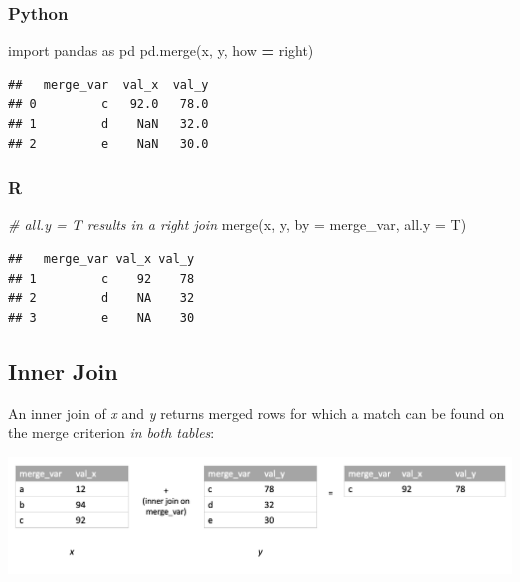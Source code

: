 \documentclass[
]{book}
\newenvironment{Shaded}{\begin{snugshade}}{\end{snugshade}}
\newcommand{\AttributeTok}[1]{\textcolor[rgb]{0.77,0.63,0.00}{#1}}
\newcommand{\CommentTok}[1]{\textcolor[rgb]{0.56,0.35,0.01}{\textit{#1}}}
\newcommand{\FunctionTok}[1]{\textcolor[rgb]{0.00,0.00,0.00}{#1}}
\newcommand{\ImportTok}[1]{#1}
\newcommand{\NormalTok}[1]{#1}
\newcommand{\OperatorTok}[1]{\textcolor[rgb]{0.81,0.36,0.00}{\textbf{#1}}}
\newcommand{\StringTok}[1]{\textcolor[rgb]{0.31,0.60,0.02}{#1}}
\begin{document}
\hypertarget{python-35}{%
\subsubsection*{Python}\label{python-35}}

\begin{Shaded}
\begin{Highlighting}[]
\ImportTok{import}\NormalTok{ pandas }\ImportTok{as}\NormalTok{ pd}
\NormalTok{pd.merge(x, y, how }\OperatorTok{=} \StringTok{\textquotesingle{}right\textquotesingle{}}\NormalTok{)}
\end{Highlighting}
\end{Shaded}

\begin{verbatim}
##   merge_var  val_x  val_y
## 0         c   92.0   78.0
## 1         d    NaN   32.0
## 2         e    NaN   30.0
\end{verbatim}

\hypertarget{r-35}{%
\subsubsection*{R}\label{r-35}}

\begin{Shaded}
\begin{Highlighting}[]
\CommentTok{\# all.y = T results in a right join}
\FunctionTok{merge}\NormalTok{(x, y, }\AttributeTok{by =} \StringTok{\textquotesingle{}merge\_var\textquotesingle{}}\NormalTok{, }\AttributeTok{all.y =}\NormalTok{ T)}
\end{Highlighting}
\end{Shaded}

\begin{verbatim}
##   merge_var val_x val_y
## 1         c    92    78
## 2         d    NA    32
## 3         e    NA    30
\end{verbatim}

\hypertarget{inner-join}{%
\subsection{Inner Join}\label{inner-join}}

An inner join of \emph{x} and \emph{y} returns merged rows for which a match can be found on the merge criterion \emph{in both tables}:

\includegraphics[width=17.25in]{images/inner_join}
\end{document}
